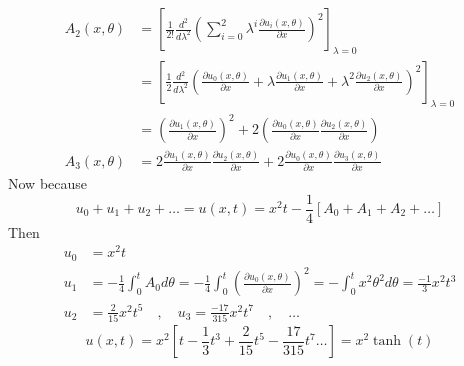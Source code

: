 \begin{example}
\begin{align*}
        \\
        A_2(x,\theta) & =\left[\frac{1}{2!} \frac{d^2}{d \lambda^2} \left(\sum_{i=0}^{2}  \lambda^i \frac{\partial u_i(x,\theta)}{\partial x}\right)^2\right]_{\lambda = 0}
        \\
                      & = \left[\frac{1}{2} \frac{d^2}{d \lambda^2} \left(\frac{\partial u_0(x,\theta)}{\partial x} + \lambda \frac{\partial u_1(x,\theta)}{\partial x} + \lambda^2 \frac{\partial u_2(x,\theta)}{\partial x}\right)^2\right]_{\lambda = 0}
        \\
                      & = \left(\frac{\partial u_1(x,\theta)}{\partial x}\right)^2 + 2 \left(\frac{\partial u_0(x,\theta)}{\partial x}\frac{\partial u_2(x,\theta)}{\partial x}\right)
        \\
        A_3(x,\theta) & = 2\frac{\partial u_1(x,\theta)}{\partial x}\frac{\partial u_2(x,\theta)}{\partial x} + 2\frac{\partial u_0(x,\theta)}{\partial x} \frac{\partial u_3(x,\theta)}{\partial x}
    \end{align*}
    Now because
    \[
        u_0 + u_1 + u_2 +\dots = u(x,t) = x^2t - \frac{1}{4}[A_0+A_1+A_2+\dots]
    \]
    Then
    \begin{align*}
        u_0 & = x^2t
        \\
        u_1 & = -\frac{1}{4}\int_{0}^{t}A_0d\theta = -\frac{1}{4}\int_{0}^{t}\left(\frac{\partial u_0(x,\theta)}{\partial x}\right)^2 = -\int_{0}^{t} x^2 \theta^2 d\theta = \frac{-1}{3}x^2t^3
        \\
        u_2 & = \frac{2}{15} x^2t^5
        \quad , \quad
        u_3 = \frac{-17}{315} x^2t^7 \quad , \quad \dots
    \end{align*}
    \[
        u(x,t) = x^2 \left[t-\frac{1}{3}t^3 + \frac{2}{15} t^5 - \frac{17}{315} t^7 \dots\right] = x^2 \tanh(t)
    \]
\end{example}

